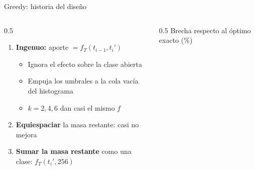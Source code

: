 \documentclass[aspectratio=169, 10pt]{beamer}
\begin{document}
\begin{frame}{Greedy: historia del diseño}
  \begin{columns}[T]
    \begin{column}{0.5\textwidth}
      \begin{enumerate}
        \item \textbf{Ingenuo:} aporte $= f_T(t_{i-1}, t_i')$
        \begin{itemize}
          \item Ignora el efecto sobre la clase abierta
          \item Empuja los umbrales a la cola vacía del histograma
          \item $k = 2, 4, 6$ dan casi el mismo $f$
        \end{itemize}
        \item \textbf{Equiespaciar} la masa restante: casi no mejora
        \item \textbf{Sumar la masa restante} como una clase: $f_T(t_i', 256)$
      \end{enumerate}
    \end{column}
    \begin{column}{0.5\textwidth}
      \centering
      {\small Brecha respecto al óptimo exacto (\%)}\\[0.3em]
    \end{column}
  \end{columns}
\end{frame}
\end{document}
